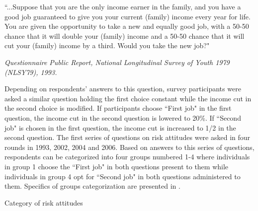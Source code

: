 \documentclass[]{article}
\begin{document}
\begin{center}
	\begin{minipage}[!h]{.9\linewidth}\small
		``...Suppose that you are the only income earner in the family, and you have a good job guaranteed to give you your current (family) income every year for life. You are given the opportunity to take a new and equally good job, with a 50-50 chance that it will double your (family) income and a 50-50 chance that it will cut your (family) income by a third. Would you take the new job?"
	\end{minipage}
\end{center}
\begin{flushright}
	\textit{Questionnaire Public Report, National Longitudinal Survey of Youth 1979 (NLSY79), 1993.}
\end{flushright}
Depending on respondents' answers to this question, survey participants were asked a similar question holding the first choice constant while the income cut in the second choice is modified. If participants choose ``First job" in the first question, the income cut in the second question is lowered to 20\%. If ``Second job" is chosen in the first question, the income cut is increased to 1/2 in the second question. The first series of questions on risk attitudes were asked in four rounds in 1993, 2002, 2004 and 2006. Based on answers to this series of questions, respondents can be categorized into four groups numbered 1-4 where individuals in group 1 choose the ``First job" in both questions present to them while individuals in group 4 opt for ``Second job" in both questions administered to them. Specifics of groups categorization are presented in .

\begin{table}[!h]
	\centering
	\setlength{\extrarowheight}{0.2em}
	\caption{Category of risk attitudes}	
	
	\label{table:1-risk-category}
\end{table}
\end{document}
